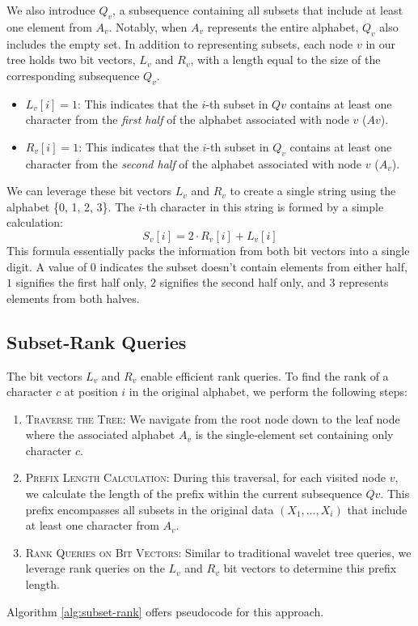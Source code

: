 \noindent We also introduce $Q_v$, a subsequence containing all subsets that include at least one element from $A_v$. Notably, when $A_v$ represents the entire alphabet, $Q_v$ also includes the empty set. In addition to representing subsets, each node $v$ in our tree holds two bit vectors, $L_v$ and $R_v$, with a length equal to the size of the corresponding subsequence $Q_v$.
\begin{itemize}
    \item $L_v[i] = 1$: This indicates that the $i$-th subset in $Qv$ contains at least one character from the \emph{first half} of the alphabet associated with node $v$ ($Av$).
    \item $R_v[i] = 1$: This indicates that the $i$-th subset in $Q_v$ contains at least one character from the \emph{second half} of the alphabet associated with node $v$ ($A_v$).
\end{itemize}
We can leverage these bit vectors $L_v$ and $R_v$ to create a single string using the alphabet \{0, 1, 2, 3\}. The $i$-th character in this string is formed by a simple calculation:
\begin{equation}
    S_v[i] = 2 \cdot R_v[i] + L_v[i]
\end{equation}
This formula essentially packs the information from both bit vectors into a single digit. A value of $0$ indicates the subset doesn't contain elements from either half, $1$ signifies the first half only, $2$ signifies the second half only, and $3$ represents elements from both halves. \vspace{0.4cm}

\subsection{Subset-Rank Queries} \label{sec:subset_rank_queries}

\noindent The bit vectors $L_v$ and $R_v$ enable efficient rank queries. To find the rank of a character $c$ at position $i$ in the original alphabet, we perform the following steps:
\begin{enumerate}
    \item \textsc{Traverse the Tree}: We navigate from the root node down to the leaf node where the associated alphabet $A_v$ is the single-element set containing only character $c$.
    \item \textsc{Prefix Length Calculation}: During this traversal, for each visited node $v$, we calculate the length of the prefix within the current subsequence $Qv$. This prefix encompasses all subsets in the original data $(X_1,\dots, X_i)$ that include at least one character from $A_v$.
    \item \textsc{Rank Queries on Bit Vectors}: Similar to traditional wavelet tree queries, we leverage rank queries on the $L_v$ and $R_v$ bit vectors to determine this prefix length.
\end{enumerate}
Algorithm \ref{alg:subset-rank} offers pseudocode for this approach.


